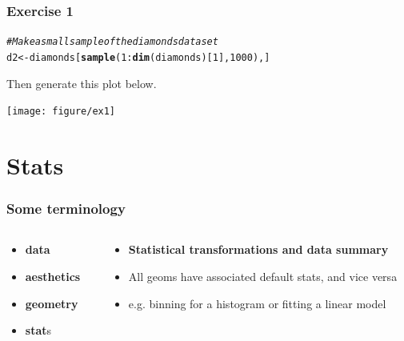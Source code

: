 \documentclass{beamer}\usepackage[]{graphicx}\usepackage[]{color}
\makeatletter
\newcommand{\hlcom}[1]{\textcolor[rgb]{0.678,0.584,0.686}{\textit{#1}}}%
\newcommand{\hlkwd}[1]{\textcolor[rgb]{0.737,0.353,0.396}{\textbf{#1}}}%
\newenvironment{kframe}{%
 \def\at@end@of@kframe{}%
 \ifinner\ifhmode%
  \def\at@end@of@kframe{\end{minipage}}%
  \begin{minipage}{\columnwidth}%
 \fi\fi%
 \def\FrameCommand##1{\hskip\@totalleftmargin \hskip-\fboxsep
 \colorbox{shadecolor}{##1}\hskip-\fboxsep
     \hskip-\linewidth \hskip-\@totalleftmargin \hskip\columnwidth}%
 \MakeFramed {\advance\hsize-\width
   \@totalleftmargin\z@ \linewidth\hsize
   \@setminipage}}%
 {\par\unskip\endMakeFramed%
 \at@end@of@kframe}
\newenvironment{knitrout}{}{} %
\makeatother
\begin{document}
\begin{frame}[fragile]
\frametitle{Exercise 1}
\begin{knitrout}\footnotesize
{}\color{fgcolor}\begin{kframe}
\begin{alltt}
\hlcom{# Make a small sample of the diamonds dataset}
d2 <- diamonds[\hlkwd{sample}(1:\hlkwd{dim}(diamonds)[1], 1000), ]
\end{alltt}
\end{kframe}
\end{knitrout}

Then generate this plot below.

\begin{knitrout}\footnotesize
{}\color{fgcolor}

{\centering \texttt{[image: figure/ex1]} 

}



\end{knitrout}

\end{frame}


\section*{Stats}
\frame{\sectionpage}


\begin{frame}[fragile]
\frametitle{Some terminology}
\begin{columns}[t]

\begin{column}[T]{3cm}
\begin{itemize}
    \item \textbf{\color{gray}data}
    \item \textbf{\color{gray}aesthetics}
    \item \textbf{\color{gray}geometry}
    \item \textbf{stat}s
\end{itemize}
\end{column}

\begin{column}[T]{8cm}
\begin{itemize}
    \item \textbf{Statistical transformations and data summary}
    \item All geoms have associated default stats, and vice versa
    \item e.g. binning for a histogram or fitting a linear model
\end{itemize}
\end{column}

\end{columns}
\end{frame}
\end{document}
